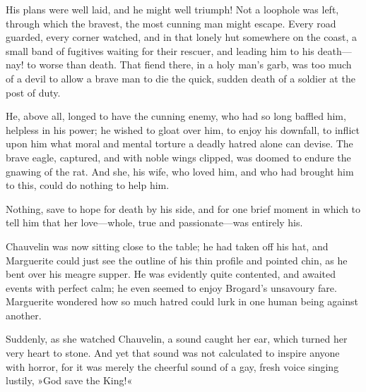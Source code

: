 His plans were well laid, and he might well triumph! Not a loophole was left, through which the bravest, the most cunning man might escape. Every road guarded, every corner watched, and in that lonely hut somewhere on the coast, a small band of fugitives waiting for their rescuer, and leading him to his death\allowbreak---\allowbreak nay! to worse than death. That fiend there, in a holy man's garb, was too much of a devil to allow a brave man to die the quick, sudden death of a soldier at the post of duty.

He, above all, longed to have the cunning enemy, who had so long baffled him, helpless in his power; he wished to gloat over him, to enjoy his downfall, to inflict upon him what moral and mental torture a deadly hatred alone can devise. The brave eagle, captured, and with noble wings clipped, was doomed to endure the gnawing of the rat. And she, his wife, who loved him, and who had brought him to this, could do nothing to help him.

Nothing, save to hope for death by his side, and for one brief moment in which to tell him that her love\allowbreak---\allowbreak whole, true and passionate\allowbreak---\allowbreak was entirely his.

Chauvelin was now sitting close to the table; he had taken off his hat, and Marguerite could just see the outline of his thin profile and pointed chin, as he bent over his meagre supper. He was evidently quite contented, and awaited events with perfect calm; he even seemed to enjoy Brogard's unsavoury fare. Marguerite wondered how so much hatred could lurk in one human being against another.

Suddenly, as she watched Chauvelin, a sound caught her ear, which turned her very heart to stone. And yet that sound was not calculated to inspire anyone with horror, for it was merely the cheerful sound of a gay, fresh voice singing lustily, »God save the King!«